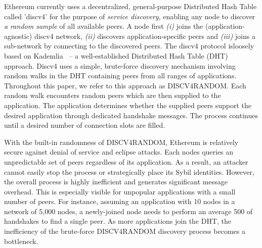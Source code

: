 


 Ethereum currently uses a decentralized, general-purpose Distributed Hash Table called 'discv4' for the purpose of \textit{service discovery}, enabling any node to discover \textit{a random sample} of all available peers. A node first \textit{(i)} joins the (application-agnostic) discv4 network, \textit{(ii)} discovers application-specific peers and \textit{(iii)} joins a sub-network by connecting to the discovered peers. The discv4 protocol isloosely based on Kademlia~\cite{maymounkov2002kademlia} – a well-established Distributed Hash Table (DHT) approach. Discv4 uses a simple, brute-force discovery mechanism involving random walks in the DHT containing peers from all ranges of applications. Throughout this paper, we refer to this approach as DISCV4RANDOM. Each random walk encounters random peers which are then supplied to the application. The application determines whether the supplied peers support the desired application through dedicated handshake messages. The process continues until a desired number of connection slots are filled. 

With the built-in randomness of DISCV4RANDOM, Ethereum is relatively secure against denial of service and eclipse attacks. Each nodes queries an unpredictable set of peers regardless of its application. As a result, an attacker cannot easily stop the process or strategically place its Sybil identities.
However, the overall process is highly inefficient and generates significant message overhead. This is especially visible for unpopular applications with a small number of peers.  For instance, assuming an application with 10 nodes in a network of 5,000 nodes, a newly-joined node needs to perform an average 500 of handshakes to find a single peer. As more applications join the DHT, the inefficiency of the brute-force DISCV4RANDOM discovery process becomes a bottleneck.

